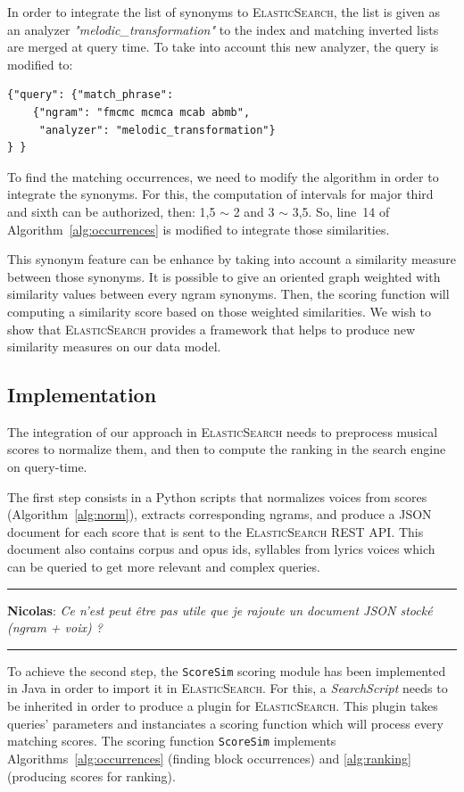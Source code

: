 \documentclass[letterpaper, 11pt]{article}
\def\elasticsearch/{\textsc{ElasticSearch}}
\newcommand{\remNT}[1]{%
\vspace*{0.1cm}
\hrule
\medskip
\noindent
\textbf{\textcolor{mygreen}{Nicolas}}: \textit{#1}
\medskip
\hrule
\vspace*{0.1cm}
}
\begin{document}
In order to integrate the list of synonyms to \elasticsearch/, the list is given as an analyzer \textit{"melodic\_transformation"} to the index and matching inverted lists are merged at query time.
To take into account this new analyzer, the query is modified to:

\begin{small}
	\begin{verbatim}
{"query": {"match_phrase": 
	{"ngram": "fmcmc mcmca mcab abmb",
	 "analyzer": "melodic_transformation"}
} }
	\end{verbatim}
\end{small}

To find the matching occurrences, we need to modify the algorithm in order to integrate the synonyms. For this, the computation of intervals for major third and sixth can be authorized, then: 1,5 $\sim$ 2 and 3 $\sim$ 3,5.
So, line~14 of Algorithm~\ref{alg:occurrences} is modified to integrate those similarities.

This synonym feature can be enhance by taking into account a similarity measure between those synonyms. It is possible to give an oriented graph weighted with similarity values between every ngram synonyms. Then, the scoring function will computing a similarity score based on those weighted similarities. We wish to show that \elasticsearch/ provides a framework that helps to produce new similarity measures on our data model.

\subsection{Implementation}

The integration of our approach in \elasticsearch/ needs to preprocess musical scores to normalize them, and then to compute the ranking in the search engine on query-time.

The first step consists in a Python scripts that normalizes voices from scores (Algorithm~\ref{alg:norm}), extracts corresponding ngrams, and produce a JSON document for each score that is sent to the \elasticsearch/ REST API. This document also contains corpus and opus ids, syllables from lyrics voices which can be queried to get more relevant and complex queries.

\remNT{Ce n'est peut être pas utile que je rajoute un document JSON stocké (ngram + voix) ?}

To achieve the second step, the \texttt{ScoreSim} scoring module has been implemented in Java in order to import it in \elasticsearch/.
For this, a \textit{SearchScript} needs to be inherited in order to produce a plugin for \elasticsearch/.
This plugin takes queries' parameters and instanciates a scoring function which will process every matching scores.
The scoring function \texttt{ScoreSim} implements  Algorithms~\ref{alg:occurrences} (finding block occurrences) and \ref{alg:ranking} (producing scores for ranking).
\end{document}
